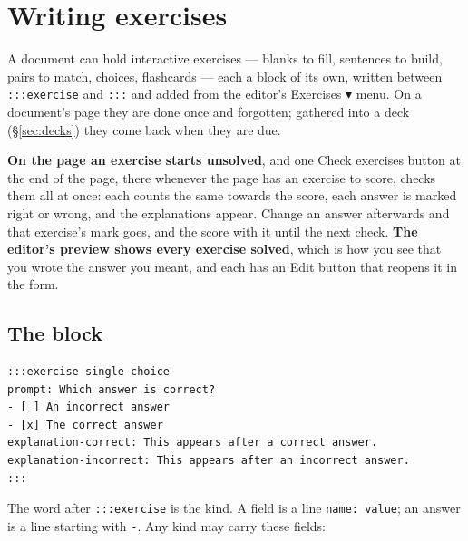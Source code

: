 \documentclass[11pt,oneside]{report}
\newcommand{\sym}[1]{{\symfont #1}}
\newcommand{\menu}[1]{\textsf{#1}}
\begin{document}
\section{Writing exercises}
\label{sec:exercises}

A document can hold interactive exercises --- blanks to fill, sentences to
build, pairs to match, choices, flashcards --- each a block of its own,
written between \texttt{:::exercise} and \texttt{:::} and added from the
editor's \menu{Exercises \sym{▾}} menu. On a document's page they are done
once and forgotten; gathered into a deck (\S\ref{sec:decks}) they come back
when they are due.

\textbf{On the page an exercise starts unsolved}, and one \menu{Check
exercises} button at the end of the page, there whenever the page has an
exercise to score, checks them all at once: each counts the same towards the
score, each answer is marked right or wrong, and the explanations appear.
Change an answer afterwards and that exercise's mark goes, and the score
with it until the next check. \textbf{The editor's preview shows every
exercise solved}, which is how you see that you wrote the answer you meant,
and each has an \menu{Edit} button that reopens it in the form.

\subsection*{The block}

\begin{lstlisting}
:::exercise single-choice
prompt: Which answer is correct?
- [ ] An incorrect answer
- [x] The correct answer
explanation-correct: This appears after a correct answer.
explanation-incorrect: This appears after an incorrect answer.
:::
\end{lstlisting}

\noindent The word after \texttt{:::exercise} is the kind. A field is a line
\texttt{name: value}; an answer is a line starting with \texttt{-}. Any kind
may carry these fields:
\end{document}
